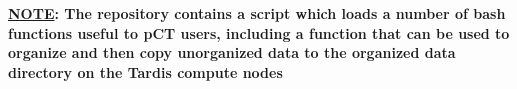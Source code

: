 \begin{tcbfunctionenv}
\begin{tcbparagraph}
\textbf{\ul{NOTE}: The  repository contains a script which loads a number of bash functions useful to pCT users, including a function that can be used to organize and then copy unorganized data to the organized data directory on the Tardis compute nodes}
\end{tcbparagraph}
\end{tcbfunctionenv}
\endinput